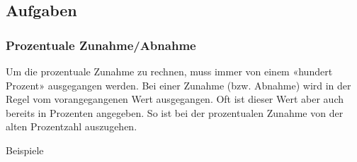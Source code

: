 \subsection*{Aufgaben}





\newpage
\subsubsection{Prozentuale Zunahme/Abnahme}\index{\%}
Um die prozentuale Zunahme zu rechnen, muss immer von einem «hundert
Prozent» ausgegangen werden. Bei einer Zunahme (bzw. Abnahme) wird in
der Regel vom vorangegangenen Wert ausgegangen. Oft ist dieser Wert
aber auch bereits in Prozenten angegeben. So ist bei der prozentualen
Zunahme von der alten Prozentzahl auszugehen.

Beispiele

